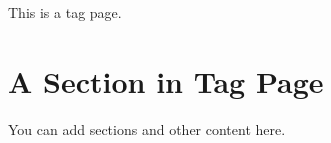 This is a tag page.\hypertarget{tag_page_tag_section}{}\section{A Section in Tag Page}\label{tag_page_tag_section}
You can add sections and other content here. 
